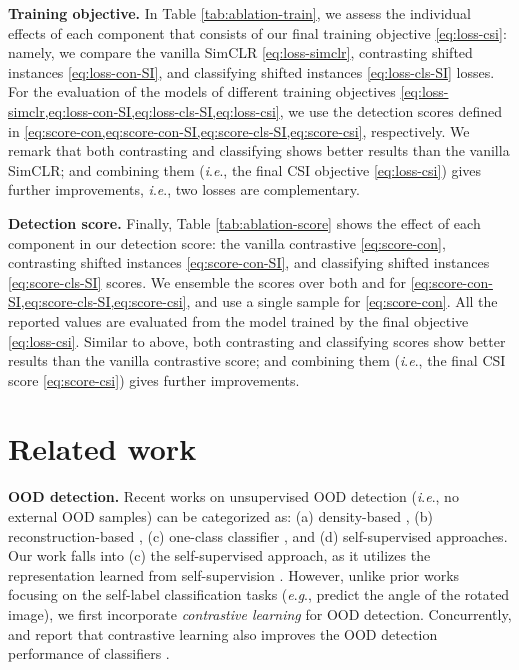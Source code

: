 \documentclass{article}
\newcommand{\ie}{\textit{i}.\textit{e}.}
\newcommand{\eg}{\textit{e}.\textit{g}.}
\begin{document}
 
\textbf{Training objective.}
In Table \ref{tab:ablation-train}, we assess the individual effects of each component that consists of our final training objective \eqref{eq:loss-csi}: namely, we compare the vanilla SimCLR \eqref{eq:loss-simclr}, contrasting shifted instances \eqref{eq:loss-con-SI}, and classifying shifted instances \eqref{eq:loss-cls-SI} losses. For the evaluation of the models of different training objectives \cref{eq:loss-simclr,eq:loss-con-SI,eq:loss-cls-SI,eq:loss-csi}, we use the detection scores defined in \cref{eq:score-con,eq:score-con-SI,eq:score-cls-SI,eq:score-csi}, respectively. We remark that both contrasting and classifying shows better results than the vanilla SimCLR; and combining them (\ie, the final CSI objective \eqref{eq:loss-csi}) gives further improvements, \ie, two losses are complementary.


\textbf{Detection score.}
Finally, Table \ref{tab:ablation-score} shows the effect of each component in our detection score: the vanilla contrastive \eqref{eq:score-con}, contrasting shifted instances \eqref{eq:score-con-SI}, and classifying shifted instances \eqref{eq:score-cls-SI} scores. We ensemble the scores over both  and  for \cref{eq:score-con-SI,eq:score-cls-SI,eq:score-csi}, and use a single sample for \cref{eq:score-con}. All the reported values are evaluated from the model trained by the final objective \ref{eq:loss-csi}.
Similar to above, both contrasting and classifying scores show better results than the vanilla contrastive score; and combining them (\ie, the final CSI score \eqref{eq:score-csi}) gives further improvements.


 \vspace{-0.06in}
\section{Related work}
\vspace{-0.06in}
\label{sec:related}


\textbf{OOD detection.}
Recent works on unsupervised OOD detection (\ie, no external OOD samples) \citep{hodge2004survey} can be categorized as: (a) density-based \citep{zhai2016deep,nalisnick2019deep,choi2018waic,nalisnick2019detecting,du2019implicit,ren2019likelihood,serra2020input,grathwohl2020your}, (b) reconstruction-based \citep{schlegl2017unsupervised,zong2018deep,deecke2018anomaly,pidhorskyi2018generative,perera2019ocgan,choi2020novelty}, (c) one-class classifier \citep{scholkopf2000support,ruff2018deep}, and (d) self-supervised \citep{golan2018deep,hendrycks2019using_self,bergman2020classification} approaches. Our work falls into (c) the self-supervised approach, as it utilizes the representation learned from self-supervision \citep{gidaris2018unsupervised}. However, unlike prior works \citep{golan2018deep,hendrycks2019using_self,bergman2020classification} focusing on the self-label classification tasks (\eg, predict the angle of the rotated image), we first incorporate \textit{contrastive learning} \citep{chen2020simple} for OOD detection. Concurrently, \citet{winkens2020contrastive} and \citet{liu2020hybrid} report that contrastive learning also improves the OOD detection performance of classifiers \citep{liang2018enhancing,lee2018simple,hendrycks2019using_self}.
\end{document}
